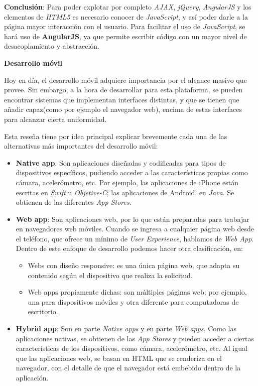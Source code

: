 \textbf{Conclusión}:
Para poder explotar por completo \textit{AJAX}, \textit{jQuery}, \textit{AngularJS} y los elementos de \textit{HTML5} es necesario conocer de \textit{JavaScript}, y así poder darle a la página mayor interacción con el usuario. 
Para facilitar el uso de \textit{JavaScript}, se hará uso de \textbf{AngularJS}, ya que permite escribir código con un mayor nivel de desacoplamiento y abstracción.


\textbf{Desarrollo móvil}

Hoy en día, el desarrollo móvil adquiere importancia por el alcance masivo que provee.
Sin embargo, a la hora de desarrollar para esta plataforma, se pueden encontrar sistemas que implementan interfaces distintas, y que se tienen que añadir capaz(como por ejemplo el navegador web), encima de estas interfaces para alcanzar cierta uniformidad.

Esta reseña tiene por idea principal explicar brevemente cada una de las alternativas más importantes del desarrollo móvil:

\begin{itemize}
\item \textbf{Native app}:
Son aplicaciones diseñadas y codificadas para tipos de dispositivos específicos, pudiendo acceder a las características propias como cámara, acelerómetro, etc.
Por ejemplo, las aplicaciones de iPhone están escritas en \textit{Swift} u \textit{Objetive-C}; las aplicaciones de Android, en \textit{Java}.
Se obtienen de las diferentes \textit{App Stores}.

\item \textbf{Web app}:
Son aplicaciones web, por lo que están preparadas para trabajar en navegadores web móviles.
Cuando se ingresa a cualquier página web desde el teléfono, que ofrece un mínimo de \textit{User Experience}, hablamos de \textit{Web App}.
Dentro de este enfoque de desarrollo podemos hacer otra clasificación, en: 
\begin{itemize}
    \item Webs con diseño responsive: es una única página web, que adapta su contenido según el dispositivo que realiza la solicitud.
    \item Web apps propiamente dichas: son múltiples páginas web; por ejemplo, una para dispositivos móviles y otra diferente para computadoras de escritorio.
\end{itemize}

\item \textbf{Hybrid app}:
Son en parte \textit{Native apps} y en parte \textit{Web apps}.
Como las aplicaciones nativas, se obtienen de las \textit{App Stores} y pueden acceder a ciertas características de los dispositivos, como cámara, acelerómetro, etc.
Al igual que las aplicaciones web, se basan en HTML que se renderiza en el navegador, con el detalle de que el navegador está embebido dentro de la aplicación.

\end{itemize}


